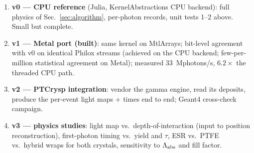 \documentclass[11pt,a4paper]{article}
\begin{document}
\begin{enumerate}
  \item \textbf{v0 --- CPU reference} (Julia, KernelAbstractions CPU backend): full physics
    of Sec.~\ref{sec:algorithm}, per-photon records, unit tests 1--2 above. Small but
    complete.
  \item \textbf{v1 --- Metal port (built)}: same kernel on MtlArrays; bit-level agreement
    with v0 on identical Philox streams (achieved on the CPU backend; few-per-million
    statistical agreement on Metal); measured 33~Mphotons/s, $6.2\times$ the threaded
    CPU path.
  \item \textbf{v2 --- PTCrysp integration}: vendor the gamma engine, read its deposits,
    produce the per-event light maps + times end to end; Geant4 cross-check campaign.
  \item \textbf{v3 --- physics studies}: light map vs.\ depth-of-interaction (input to
    position reconstruction), first-photon timing vs.\ yield and $\tau$, ESR vs.\ PTFE
    vs.\ hybrid wraps for both crystals, sensitivity to $\Lambda_{\rm abs}$ and fill
    factor.
\end{enumerate}
\end{document}
